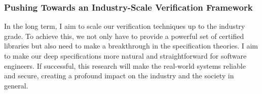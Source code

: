 \documentclass[a4paper, 10pt]{article}
\begin{document}
\begin{small}
\subsubsection*{\small Pushing Towards  an Industry-Scale Verification Framework}
In the long term, I aim to 
scale our verification techniques up to the industry grade. To achieve this, we not only have to provide a  powerful
set of certified libraries but also need to make a breakthrough in the specification theories.
I aim to make our  deep specifications more natural and straightforward for software engineers.
If successful,
this research will make
the real-world systems reliable and secure, creating  a profound impact on the  industry and the society in general.
 
\vspace{0.5cm}

\end{small}
\end{document}
